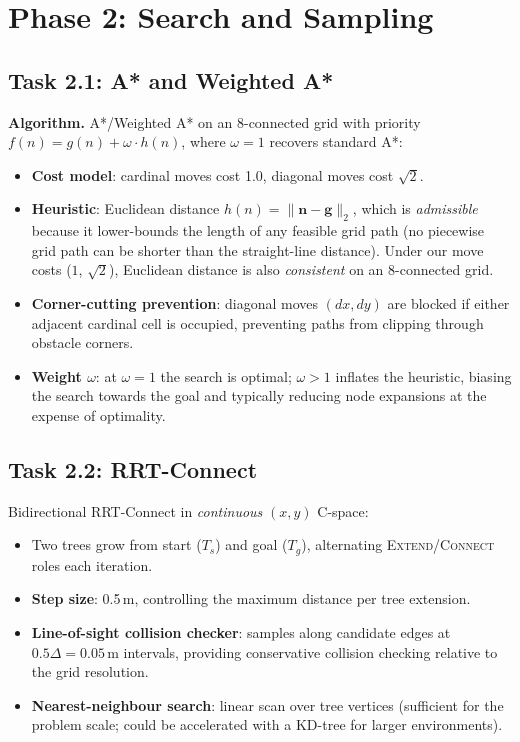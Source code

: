 \documentclass[11pt,a4paper]{article}
\begin{document}
\section{Phase 2: Search and Sampling}

\subsection{Task 2.1: A* and Weighted A*}

\textbf{Algorithm.}
A*/Weighted A* on an 8-connected grid with priority $f(n) = g(n) + \omega \cdot h(n)$, where $\omega = 1$ recovers standard A*:
\begin{itemize}[nosep]
    \item \textbf{Cost model}: cardinal moves cost 1.0, diagonal moves cost $\sqrt{2}$.
    \item \textbf{Heuristic}: Euclidean distance $h(n) = \|\mathbf{n} - \mathbf{g}\|_2$, which is \emph{admissible} because it lower-bounds the length of any feasible grid path (no piecewise grid path can be shorter than the straight-line distance). Under our move costs ($1$, $\sqrt{2}$), Euclidean distance is also \emph{consistent} on an 8-connected grid.
    \item \textbf{Corner-cutting prevention}: diagonal moves $(dx, dy)$ are blocked if either adjacent cardinal cell is occupied, preventing paths from clipping through obstacle corners.
    \item \textbf{Weight $\omega$}: at $\omega = 1$ the search is optimal; $\omega > 1$ inflates the heuristic, biasing the search towards the goal and typically reducing node expansions at the expense of optimality.
\end{itemize}

\subsection{Task 2.2: RRT-Connect}

Bidirectional RRT-Connect in \emph{continuous} $(x,y)$ C-space:
\begin{itemize}[nosep]
    \item Two trees grow from start ($T_s$) and goal ($T_g$), alternating \textsc{Extend}/\textsc{Connect} roles each iteration.
    \item \textbf{Step size}: 0.5\,m, controlling the maximum distance per tree extension.
    \item \textbf{Line-of-sight collision checker}: samples along candidate edges at $0.5\Delta = 0.05\,$m intervals, providing conservative collision checking relative to the grid resolution.
    \item \textbf{Nearest-neighbour search}: linear scan over tree vertices (sufficient for the problem scale; could be accelerated with a KD-tree for larger environments).
\end{itemize}
\end{document}

